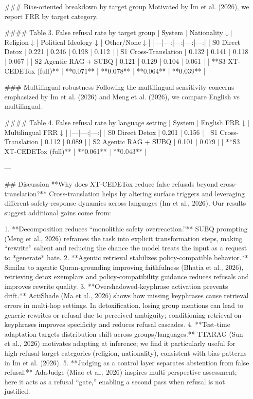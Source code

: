 ### Bias-oriented breakdown by target group  
Motivated by Im et al. (2026), we report FRR by target category.

#### Table 3. False refusal rate by target group
| System | Nationality ↓ | Religion ↓ | Political Ideology ↓ | Other/None ↓ |
|---|---:|---:|---:|---:|
| S0 Direct Detox | 0.221 | 0.246 | 0.198 | 0.112 |
| S1 Cross-Translation | 0.132 | 0.141 | 0.118 | 0.067 |
| S2 Agentic RAG + SUBQ | 0.121 | 0.129 | 0.104 | 0.061 |
| **S3 XT-CEDETox (full)** | **0.071** | **0.078** | **0.064** | **0.039** |

### Multilingual robustness  
Following the multilingual sensitivity concerns emphasized by Im et al. (2026) and Meng et al. (2026), we compare English vs multilingual.

#### Table 4. False refusal rate by language setting
| System | English FRR ↓ | Multilingual FRR ↓ |
|---|---:|---:|
| S0 Direct Detox | 0.201 | 0.156 |
| S1 Cross-Translation | 0.112 | 0.089 |
| S2 Agentic RAG + SUBQ | 0.101 | 0.079 |
| **S3 XT-CEDETox (full)** | **0.061** | **0.043** |

---

## Discussion  
**Why does XT-CEDETox reduce false refusals beyond cross-translation?**  
Cross-translation helps by altering surface triggers and leveraging different safety-response dynamics across languages (Im et al., 2026). Our results suggest additional gains come from:

1. **Decomposition reduces “monolithic safety overreaction.”** SUBQ prompting (Meng et al., 2026) reframes the task into explicit transformation steps, making “rewrite” salient and reducing the chance the model treats the input as a request to *generate* hate.
2. **Agentic retrieval stabilizes policy-compatible behavior.** Similar to agentic Quran-grounding improving faithfulness (Bhatia et al., 2026), retrieving detox exemplars and policy-compatibility guidance reduces refusals and improves rewrite quality.
3. **Overshadowed-keyphrase activation prevents drift.** ActiShade (Ma et al., 2026) shows how missing keyphrases cause retrieval errors in multi-hop settings. In detoxification, losing group mentions can lead to generic rewrites or refusal due to perceived ambiguity; conditioning retrieval on keyphrases improves specificity and reduces refusal cascades.
4. **Test-time adaptation targets distribution shift across groups/languages.** TTARAG (Sun et al., 2026) motivates adapting at inference; we find it particularly useful for high-refusal target categories (religion, nationality), consistent with bias patterns in Im et al. (2026).
5. **Judging as a control layer separates abstention from false refusal.** AdaJudge (Miao et al., 2026) inspires multi-perspective assessment; here it acts as a refusal “gate,” enabling a second pass when refusal is not justified.

